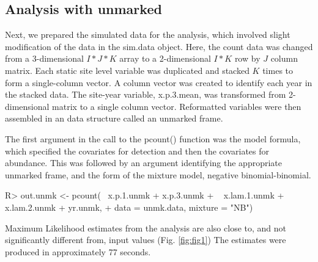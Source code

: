 \documentclass[article]{jss}
\begin{document}
\subsection[Analysis with unmarked]{Analysis with unmarked}
Next, we prepared the simulated data for the  analysis, which involved slight modification of the data in the sim.data object. Here, the count data was changed from a 3-dimensional $I*J*K$ array to a 2-dimensional $I*K$ row by $J$ column matrix.  Each static site level variable was duplicated and stacked $K$ times to form a single-column vector. A column vector was created to identify each year in the stacked data. The site-year variable, x.p.3.mean, was transformed from 2-dimensional matrix to a single column vector. Reformatted variables were then assembled in an  data structure called an unmarked frame.


The first argument in the call to the pcount() function was the model formula, which specified the covariates for detection and then the covariates for abundance. This was followed by an argument identifying the appropriate unmarked frame, and the form of the mixture model, negative binomial-binomial.

\begin{Code}
R> out.unmk <- pcount(~ x.p.1.unmk + x.p.3.unmk
+                     ~ x.lam.1.unmk + x.lam.2.unmk + yr.unmk,
+                       data = unmk.data, mixture = "NB")
\end{Code}

Maximum Likelihood estimates from the  analysis are also close to, and not significantly different from, input values (Fig. \ref{fig:fig1})  The  estimates were produced in approximately 77 seconds.
\end{document}
